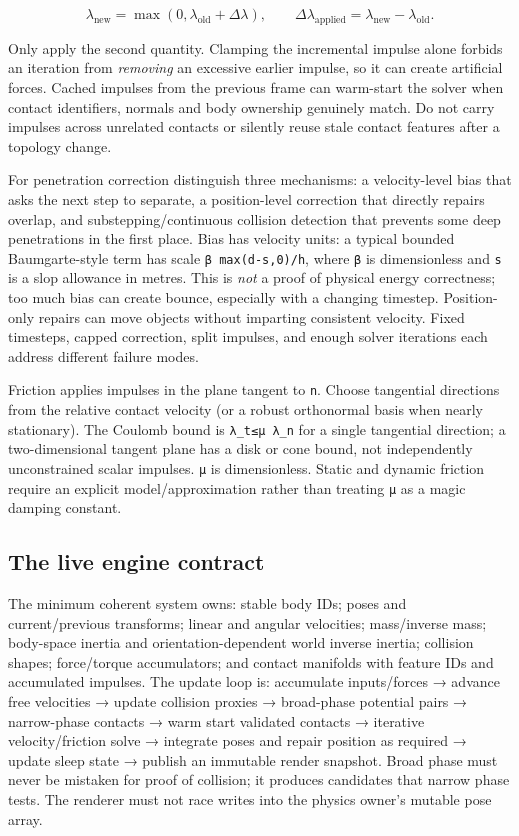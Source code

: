 \[
\lambda_{\mathrm{new}}=\max(0,\lambda_{\mathrm{old}}+\Delta\lambda),\qquad
\Delta\lambda_{\mathrm{applied}}=\lambda_{\mathrm{new}}-\lambda_{\mathrm{old}}.
\]

Only apply the second quantity. Clamping the incremental impulse alone forbids an iteration from \emph{removing} an excessive earlier impulse, so it can create artificial forces. Cached impulses from the previous frame can warm-start the solver when contact identifiers, normals and body ownership genuinely match. Do not carry impulses across unrelated contacts or silently reuse stale contact features after a topology change.

For penetration correction distinguish three mechanisms: a velocity-level bias that asks the next step to separate, a position-level correction that directly repairs overlap, and substepping/continuous collision detection that prevents some deep penetrations in the first place. Bias has velocity units: a typical bounded Baumgarte-style term has scale \texttt{β\ max(d-s,0)/h}, where \texttt{β} is dimensionless and \texttt{s} is a slop allowance in metres. This is \emph{not} a proof of physical energy correctness; too much bias can create bounce, especially with a changing timestep. Position-only repairs can move objects without imparting consistent velocity. Fixed timesteps, capped correction, split impulses, and enough solver iterations each address different failure modes.

Friction applies impulses in the plane tangent to \texttt{n}. Choose tangential directions from the relative contact velocity (or a robust orthonormal basis when nearly stationary). The Coulomb bound is \texttt{\textbar{}λ\_t\textbar{}≤μ\ λ\_n} for a single tangential direction; a two-dimensional tangent plane has a disk or cone bound, not independently unconstrained scalar impulses. \texttt{μ} is dimensionless. Static and dynamic friction require an explicit model/approximation rather than treating \texttt{μ} as a magic damping constant.

\subsection{The live engine contract}\label{02-foundations-ii-ch039-the-live-engine-contract}

The minimum coherent system owns: stable body IDs; poses and current/previous transforms; linear and angular velocities; mass/inverse mass; body-space inertia and orientation-dependent world inverse inertia; collision shapes; force/torque accumulators; and contact manifolds with feature IDs and accumulated impulses. The update loop is: accumulate inputs/forces → advance free velocities → update collision proxies → broad-phase potential pairs → narrow-phase contacts → warm start validated contacts → iterative velocity/friction solve → integrate poses and repair position as required → update sleep state → publish an immutable render snapshot. Broad phase must never be mistaken for proof of collision; it produces candidates that narrow phase tests. The renderer must not race writes into the physics owner's mutable pose array.

